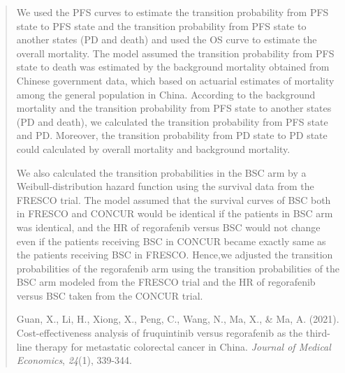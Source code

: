 \documentclass[
]{article}
\begin{document}
\begin{quote}
We used the PFS curves to estimate the transition probability from PFS
state to PFS state and the transition probability from PFS state to
another states (PD and death) and used the OS curve to estimate the
overall mortality. The model assumed the transition probability from PFS
state to death was estimated by the background mortality obtained from
Chinese government data, which based on actuarial estimates of mortality
among the general population in China. According to the background
mortality and the transition probability from PFS state to another
states (PD and death), we calculated the transition probability from PFS
state and PD. Moreover, the transition probability from PD state to PD
state could calculated by overall mortality and background mortality.

We also calculated the transition probabilities in the BSC arm by a
Weibull-distribution hazard function using the survival data from the
FRESCO trial. The model assumed that the survival curves of BSC both in
FRESCO and CONCUR would be identical if the patients in BSC arm was
identical, and the HR of regorafenib versus BSC would not change even if
the patients receiving BSC in CONCUR became exactly same as the patients
receiving BSC in FRESCO. Hence,we adjusted the transition probabilities
of the regorafenib arm using the transition probabilities of the BSC arm
modeled from the FRESCO trial and the HR of regorafenib versus BSC taken
from the CONCUR trial.

Guan, X., Li, H., Xiong, X., Peng, C., Wang, N., Ma, X., \& Ma, A.
(2021). Cost-effectiveness analysis of fruquintinib versus regorafenib
as the third-line therapy for metastatic colorectal cancer in China.
\emph{Journal of Medical Economics}, \emph{24}(1), 339-344.
\end{quote}
\end{document}
